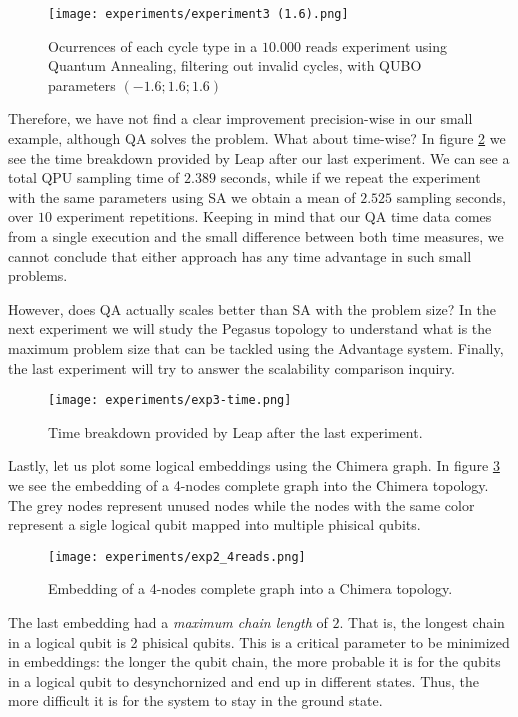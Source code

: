 \begin{figure}[H]
	\texttt{[image: experiments/experiment3 (1.6).png]}
	\centering
	\caption{Ocurrences of each cycle type in a $10.000$ reads experiment using Quantum Annealing, filtering out invalid cycles, with QUBO parameters $(-1.6; 1.6; 1.6)$}
	\label{fig:exp3-occ2}
\end{figure}

Therefore, we have not find a clear improvement precision-wise in our small example, although QA solves the problem. What about time-wise? In figure \ref{fig:exp3-time} we see the time breakdown provided by Leap after our last experiment. We can see a total QPU sampling time of $2.389$ seconds, while if we repeat the experiment with the same parameters using SA we obtain a mean of $2.525$ sampling seconds, over $10$ experiment repetitions. Keeping in mind that our QA time data comes from a single execution and the small difference between both time measures, we cannot conclude that either approach has any time advantage in such small problems.

However, does QA actually scales better than SA with the problem size? In the next experiment we will study the Pegasus topology to understand what is the maximum problem size that can be tackled using the Advantage system. Finally, the last experiment will try to answer the scalability comparison inquiry.

\begin{figure}[h]
	\texttt{[image: experiments/exp3-time.png]}
	\centering
	\caption{Time breakdown provided by Leap after the last experiment.}
	\label{fig:exp3-time}
\end{figure}

Lastly, let us plot some logical embeddings using the Chimera graph. In figure \ref{fig:exp2_4reads} we see the embedding of a 4-nodes complete graph into the Chimera topology. The grey nodes represent unused nodes while the nodes with the same color represent a sigle logical qubit mapped into multiple phisical qubits.

\begin{figure}[h]
	\texttt{[image: experiments/exp2\_4reads.png]}
	\centering
	\caption{Embedding of a 4-nodes complete graph into a Chimera topology.}
	\label{fig:exp2_4reads}
\end{figure}

The last embedding had a \emph{maximum chain length} of $2$. That is, the longest chain in a logical qubit is 2 phisical qubits. This is a critical parameter to be minimized in embeddings: the longer the qubit chain, the more probable it is for the qubits in a logical qubit to desynchornized and end up in different states. Thus, the more difficult it is for the system to stay in the ground state.

